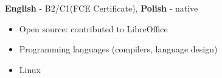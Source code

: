 \documentclass[8pt]{developercv} %
\begin{document}
\vspace{-10 pt}
    \vspace{-6pt}
    
    \hspace{26mm} \textbf{English} - B2/C1\hspace{3pt}(FCE Certificate), \textbf{ Polish} - native

\vspace{-8 pt}
    \vspace{-6pt}
    
    \begin{itemize}[topsep=0pt,parsep=0pt,partopsep=0pt,leftmargin=26mm]
    \item Open source: contributed to LibreOffice
    \item Programming languages (compilers, language design)
    \item Linux
\end{itemize}

\vspace*{\fill}




\end{document}

